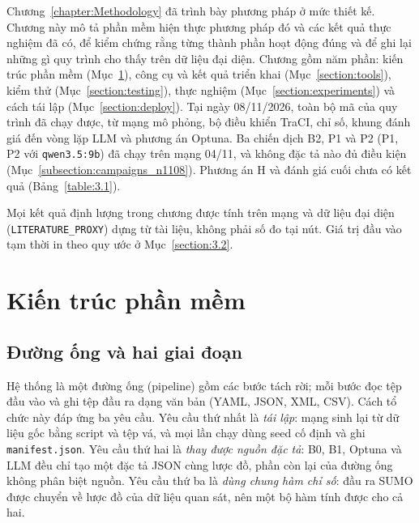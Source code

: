 \documentclass[../main.tex]{subfiles}
\begin{document}

Chương~\ref{chapter:Methodology} đã trình bày phương pháp ở mức thiết kế. Chương này mô tả phần mềm hiện thực phương pháp đó và các kết quả thực nghiệm đã có, để kiểm chứng rằng từng thành phần hoạt động đúng và để ghi lại những gì quy trình cho thấy trên dữ liệu đại diện. Chương gồm năm phần: kiến trúc phần mềm (Mục~\ref{section:architecture}), công cụ và kết quả triển khai (Mục~\ref{section:tools}), kiểm thử (Mục~\ref{section:testing}), thực nghiệm (Mục~\ref{section:experiments}) và cách tái lập (Mục~\ref{section:deploy}). Tại ngày 08/11/2026, toàn bộ mã của quy trình đã chạy được, từ mạng mô phỏng, bộ điều khiển TraCI, chỉ số, khung đánh giá đến vòng lặp LLM và phương án Optuna. Ba chiến dịch B2, P1 và P2 (P1, P2 với \texttt{qwen3.5:9b}) đã chạy trên mạng 04/11, và không đặc tả nào đủ điều kiện (Mục~\ref{subsection:campaigns_n1108}). Phương án H và đánh giá cuối chưa có kết quả (Bảng~\ref{table:3.1}).

Mọi kết quả định lượng trong chương được tính trên mạng và dữ liệu đại diện (\texttt{LITERATURE\_PROXY}) dựng từ tài liệu, không phải số đo tại nút. Giá trị đầu vào tạm thời in  theo quy ước ở Mục~\ref{section:3.2}.

\section{Kiến trúc phần mềm}
\label{section:architecture}

\subsection{Đường ống và hai giai đoạn}

Hệ thống là một đường ống (pipeline) gồm các bước tách rời; mỗi bước đọc tệp đầu vào và ghi tệp đầu ra dạng văn bản (YAML, JSON, XML, CSV). Cách tổ chức này đáp ứng ba yêu cầu. Yêu cầu thứ nhất là \emph{tái lập}: mạng sinh lại từ dữ liệu gốc bằng script và tệp vá, và mọi lần chạy dùng seed cố định và ghi \texttt{manifest.json}. Yêu cầu thứ hai là \emph{thay được nguồn đặc tả}: B0, B1, Optuna và LLM đều chỉ tạo một đặc tả JSON cùng lược đồ, phần còn lại của đường ống không phân biệt nguồn. Yêu cầu thứ ba là \emph{dùng chung hàm chỉ số}: đầu ra SUMO được chuyển về lược đồ của dữ liệu quan sát, nên một bộ hàm tính được cho cả hai.
\end{document}
